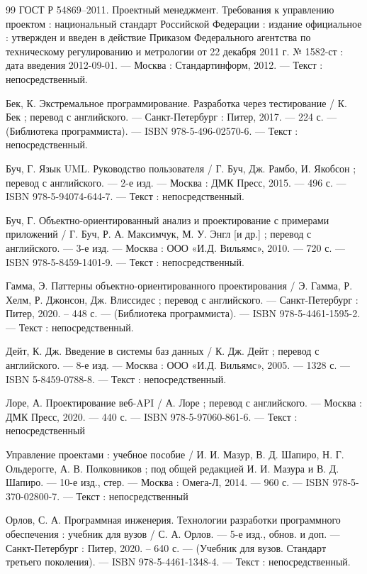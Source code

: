 \begin{thebibliography}{99}
	 ГОСТ Р 54869–2011. Проектный менеджмент. Требования к управлению проектом : национальный стандарт Российской Федерации : издание официальное : утвержден и введен в действие Приказом Федерального агентства по техническому регулированию и метрологии от 22 декабря 2011 г.
	№ 1582-ст : дата введения 2012-09-01. --- Москва : Стандартинформ, 2012. --- Текст : непосредственный.
	
	 Бек, К. Экстремальное программирование. Разработка через тестирование / К. Бек ; перевод с английского. --- Санкт-Петербург : Питер, 2017. --- 224 с. --- (Библиотека программиста). --- ISBN 978-5-496-02570-6. --- Текст : непосредственный.
	
	 Буч, Г. Язык UML. Руководство пользователя / Г. Буч, Дж. Рамбо, И. Якобсон ; перевод с английского. --- 2-е изд. --- Москва : ДМК Пресс, 2015. --- 496 с. --- ISBN 978-5-94074-644-7. --- Текст : непосредственный.
	
	 Буч, Г. Объектно-ориентированный анализ и проектирование с примерами приложений / Г. Буч, Р. А. Максимчук, М. У. Энгл [и др.] ; перевод с английского. --- 3-е изд. --- Москва : ООО «И.Д. Вильямс», 2010. --- 720 с. --- ISBN 978-5-8459-1401-9. --- Текст : непосредственный.
	
	 Гамма, Э. Паттерны объектно-ориентированного проектирования / Э. Гамма, Р. Хелм, Р. Джонсон, Дж. Влиссидес ; перевод с английского. --- Санкт-Петербург : Питер, 2020. – 448 с. --- (Библиотека программиста). --- ISBN 978-5-4461-1595-2. --- Текст : непосредственный.
	
	 Дейт, К. Дж. Введение в системы баз данных / К. Дж. Дейт ; перевод с английского. --- 8-е изд. --- Москва : ООО «И.Д. Вильямс», 2005. --- 1328 с. --- ISBN 5-8459-0788-8. --- Текст : непосредственный.
	
	 Лоре, А. Проектирование веб-API / А. Лоре ; перевод с английского. --- Москва : ДМК Пресс, 2020. --- 440 с. --- ISBN 978-5-97060-861-6. --- Текст : непосредственный
	
	 Управление проектами : учебное пособие / И. И. Мазур, В. Д. Шапиро, Н. Г. Ольдерогге, А. В. Полковников ; под общей редакцией И. И. Мазура и В. Д. Шапиро. --- 10-е изд., стер. --- Москва : Омега-Л, 2014. --- 960 с. --- ISBN 978-5-370-02800-7. --- Текст : непосредственный
	
	 Орлов, С. А. Программная инженерия. Технологии разработки программного обеспечения : учебник для вузов / С. А. Орлов. --- 5-е изд., обнов. и доп. --- Санкт-Петербург : Питер, 2020. – 640 с. --- (Учебник для вузов. Стандарт третьего поколения). --- ISBN 978-5-4461-1348-4. --- Текст : непосредственный.
	

\end{thebibliography}
